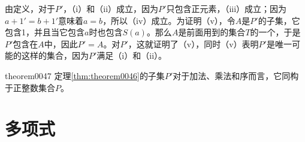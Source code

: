由定义，对于$P'$，（i）和（ii）成立，因为$P'$只包含正元素，（iii）成立；因为$a+1'=b+1'$意味着$a=b$，所以（iv）成立。为证明（v），令$A$是$P'$的子集，它包含1，并且当它包含$a$时也包含$S(a)$。那么$A$是前面用到的集合$T$的一个，于是$P'$包含在$A$中，因此$P'=A$。对$P'$，这就证明了（v），同时（v）表明$P'$是唯一可能的这样的集合，因为$P'$满足（i）和（ii）。

\begin{theorem}{}{theorem0047}
定理\ref{thm:theorem0046}的子集$P'$对于加法、乘法和序而言，它同构于正整数集合$P$。
\end{theorem}


\section{多项式}

